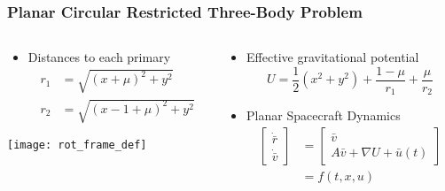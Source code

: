 \begin{frame} %
\frametitle{Planar Circular Restricted Three-Body Problem}
\begin{columns}
\begin{column}{0.5\textwidth}
   \begin{itemize}
   		\item Distances to each primary
		\begin{align*}
			r_1 &= \sqrt{\left( x+ \mu\right)^2 + y^2} \\
			r_2 &= \sqrt{\left( x - 1 + \mu\right)^2 + y^2}
		\end{align*}
   \end{itemize}
   \texttt{[image: rot\_frame\_def]}
\end{column}
\begin{column}{0.5\textwidth}
	\begin{itemize}
		\item Effective gravitational potential
	\begin{equation*}
		U = \frac{1}{2} \left( x^2 + y^2\right) + \frac{1-\mu}{r_1} + \frac{\mu}{r_2}
		\label{eq:eff_pot}
	\end{equation*}
		\item Planar Spacecraft Dynamics
\begin{align*}
	\left[\begin{array}{c} \dot{\bar{r}} \\ \dot{\bar{v}} \end{array} \right] &= 
	\left[ \begin{array}{c} \bar{v} \\ A \bar{v} + \nabla U + \bar{u}(t) \end{array} \right] \\
	&= f\left( t,x, u\right)
\end{align*}
	\end{itemize}
	
	
\end{column}
\end{columns}
\end{frame}   %

\section*{}
